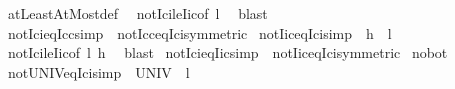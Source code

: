 \begin{isabellebody}
\isadelimproof
%
\endisadelimproof
%
\isatagproof
{}\isamarkupfalse%
\ atLeastAtMost{\isacharunderscore}{\kern0pt}def\ \isamarkupfalse%
\ not{\isacharunderscore}{\kern0pt}Ici{\isacharunderscore}{\kern0pt}le{\isacharunderscore}{\kern0pt}Iic{\isacharbrackleft}{\kern0pt}of\ l{\isacharprime}{\kern0pt}{\isacharbrackright}{\kern0pt}\ \isamarkupfalse%
\ blast%
\endisatagproof
{\isafoldproof}%
%
\isadelimproof
\isanewline
%
\endisadelimproof
\isanewline
{}\isamarkupfalse%
\ not{\isacharunderscore}{\kern0pt}Ici{\isacharunderscore}{\kern0pt}eq{\isacharunderscore}{\kern0pt}Icc{\isacharbrackleft}{\kern0pt}simp{\isacharbrackright}{\kern0pt}\ {\isacharequal}{\kern0pt}\ not{\isacharunderscore}{\kern0pt}Icc{\isacharunderscore}{\kern0pt}eq{\isacharunderscore}{\kern0pt}Ici{\isacharbrackleft}{\kern0pt}symmetric{\isacharbrackright}{\kern0pt}\isanewline
\isanewline
\isanewline
{}\isamarkupfalse%
\ not{\isacharunderscore}{\kern0pt}Iic{\isacharunderscore}{\kern0pt}eq{\isacharunderscore}{\kern0pt}Ici{\isacharbrackleft}{\kern0pt}simp{\isacharbrackright}{\kern0pt}{\isacharcolon}{\kern0pt}\ {\isachardoublequoteopen}{\isasymnot}\ {\isacharbraceleft}{\kern0pt}{\isachardot}{\kern0pt}{\isachardot}{\kern0pt}h{\isacharbraceright}{\kern0pt}\ {\isacharequal}{\kern0pt}\ {\isacharbraceleft}{\kern0pt}l{\isacharprime}{\kern0pt}{\isachardot}{\kern0pt}{\isachardot}{\kern0pt}{\isacharbraceright}{\kern0pt}{\isachardoublequoteclose}\isanewline
%
\isadelimproof
%
\endisadelimproof
%
\isatagproof
{}\isamarkupfalse%
\ not{\isacharunderscore}{\kern0pt}Ici{\isacharunderscore}{\kern0pt}le{\isacharunderscore}{\kern0pt}Iic{\isacharbrackleft}{\kern0pt}of\ l{\isacharprime}{\kern0pt}\ h{\isacharbrackright}{\kern0pt}\ \isamarkupfalse%
\ blast%
\endisatagproof
{\isafoldproof}%
%
\isadelimproof
\isanewline
%
\endisadelimproof
\isanewline
{}\isamarkupfalse%
\ not{\isacharunderscore}{\kern0pt}Ici{\isacharunderscore}{\kern0pt}eq{\isacharunderscore}{\kern0pt}Iic{\isacharbrackleft}{\kern0pt}simp{\isacharbrackright}{\kern0pt}\ {\isacharequal}{\kern0pt}\ not{\isacharunderscore}{\kern0pt}Iic{\isacharunderscore}{\kern0pt}eq{\isacharunderscore}{\kern0pt}Ici{\isacharbrackleft}{\kern0pt}symmetric{\isacharbrackright}{\kern0pt}\isanewline
\isanewline
{}\isamarkupfalse%
\isanewline
\isanewline
{}\isamarkupfalse%
\ no{\isacharunderscore}{\kern0pt}bot\isanewline
{}\isanewline
\isanewline
{}\isamarkupfalse%
\ not{\isacharunderscore}{\kern0pt}UNIV{\isacharunderscore}{\kern0pt}eq{\isacharunderscore}{\kern0pt}Ici{\isacharbrackleft}{\kern0pt}simp{\isacharbrackright}{\kern0pt}{\isacharcolon}{\kern0pt}\ {\isachardoublequoteopen}{\isasymnot}\ UNIV\ {\isacharequal}{\kern0pt}\ {\isacharbraceleft}{\kern0pt}l{\isacharprime}{\kern0pt}{\isachardot}{\kern0pt}{\isachardot}{\kern0pt}{\isacharbraceright}{\kern0pt}{\isachardoublequoteclose}\isanewline

\end{isabellebody}

